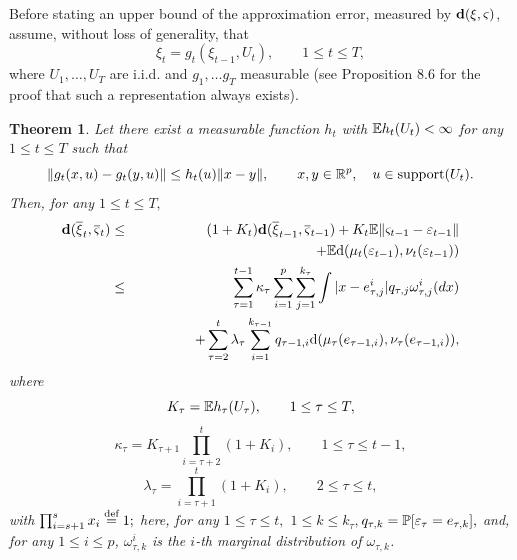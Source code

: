 \documentclass{article}              %
\newcommand{\tbd}[1]{{ \bf [ TBD #1 ]}}
\newtheorem{theorem}{Theorem}
\begin{document}
Before stating an upper bound of the approximation error, measured
by $\d(\xi,\varsigma)$, assume, without loss of generality, that
\begin{equation}
\xi_{t}=g_{t}(\xi_{t-1},U_{t}),\qquad1\leq t\leq T,\label{eq:xxu}
\end{equation}
where $U_{1},\dots,U_{T}$ are i.i.d. and $g_{1},\dots g_{T}$ measurable (see \cite{Kallenberg02} Proposition
8.6 for the proof that such a representation always exists).

\begin{theorem}
\label{prop:est} Let there exist a measurable
function $h_{t}$ with $\E h_{t}(U_{t})<\infty$ for any $1\leq t\leq T$ such that 
\begin{equation}
\|g_{t}(x,u)-g_{t}(y,u)\|\leq h_{t}(u)\|x-y\|,\qquad
x,y\in\R^{p},\quad u\in\supp(U_{t}).\label{eq:htl}
\end{equation}
Then, for any $1\leq t\leq T,$ 
\begin{eqnarray}
\d(\barxi_{t},\barvs_{t}) & \leq & (1+K_{t})\d(\barxi_{t-1},\barvs_{t-1})+K_{t}\E\|\varsigma_{t-1}-\varepsilon_{t-1}\| \nonumber \\
& & \qquad \qquad +\E\dw(\mu_{t}(\varepsilon_{t-1}),\nu_{t}(\varepsilon_{t-1}))\label{eq:dfirst}\\
 & \leq & \sum_{\tau=1}^{t-1}\kappa_{\tau}\sum_{i=1}^{p}\sum_{j=1}^{k_{\tau}}\int|x-e_{\tau,j}^{i}|q_{\tau,j}\omega^i_{\tau,j}(dx)
\nonumber \\ 
& & \qquad \qquad +\sum_{\tau=2}^{t}\lambda_{\tau}\sum_{i=1}^{k_{\tau-1}}q_{\tau-1,i}\dw(\mu_{\tau}(e_{\text{\ensuremath{\tau}}-1,i}),\nu_{\tau}(e_{\tau-1,i})),\label{eq:dthird}
\end{eqnarray}
where
\[
K_{\tau}=\E h_\tau (U_{\tau}),\qquad1\leq\tau\leq T,
\]
\[
\kappa_{\tau}=K_{\tau+1}\prod_{i=\tau+2}^{t}(1+K_{i}),\qquad1\leq\tau\leq t-1,
\]
\[
\lambda_{\tau}=\prod_{i=\tau+1}^{t}(1+K_{i}),\qquad2\leq\tau\leq t,
\]
with $\prod_{i=s+1}^{s}x_{i}\defined1;$ here, \textup{\emph{for any
}}\textup{$1\leq\tau\leq t,$} $1\leq k\leq k_{\tau},$$q_{\tau,k}=\P[\varepsilon_{\tau}=e_{\tau,k}],$
and, for any $1\leq i\leq p$,\textup{\emph{ $\omega_{\tau,k}^{i}$
is the $i$-th marginal distribution of $\omega_{\tau,k}$. }}
\end{theorem}
\end{document}
